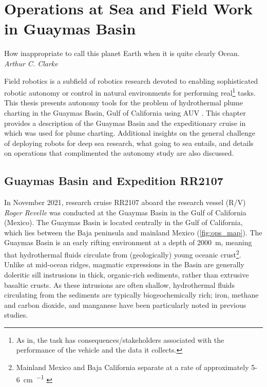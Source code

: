 \chapter{Operations at Sea and Field Work in Guaymas Basin}
\label{chap:opsatsea}

\begin{center}
    \begin{minipage}{0.6\textwidth}
      \begin{small}
        How inappropriate to call this planet Earth when it is quite clearly Ocean.\\ \emph{Arthur C. Clarke}
      \end{small}
    \end{minipage}
    \vspace{0.5cm}
\end{center}

Field robotics is a subfield of robotics research devoted to enabling sophisticated robotic autonomy or control in natural environments for performing real\footnote{As in, the task has consequences/stakeholders associated with the performance of the vehicle and the data it collects.} tasks.
This thesis presents autonomy tools for the problem of hydrothermal plume charting in the Guaymas Basin, Gulf of California using AUV \Sentry. 
This chapter provides a description of the Guaymas Basin and the expeditionary cruise in which \Sentry was used for plume charting.
Additional insights on the general challenge of deploying robots for deep sea research, what going to sea entails, and details on operations that complimented the autonomy study are also discussed. 

\section{Guaymas Basin and Expedition RR2107}
\label{sec:guaymas_description}
In November 2021, research cruise RR2107 aboard the research vessel (R/V) \emph{Roger Revelle} was conducted at the Guaymas Basin in the Gulf of California (Mexico).
The Guaymas Basin is located centrally in the Gulf of California, which lies between the Baja peninsula and mainland Mexico (\cref{fig:ops_map}).
The Guaymas Basin is an early rifting environment at a depth of \SI{2000}{\meter}\autocite{scholz2019shelf,moore1982geologic,teske2016guaymas}, meaning that hydrothermal fluids circulate from (geologically) young oceanic crust\footnote{Mainland Mexico and Baja California separate at a rate of approximately 5-\SI{6}{\cm\per\year} \autocite{lonsdale1985hydrothermal}}.
Unlike at mid-ocean ridges, magmatic expressions in the Basin are generally doleritic sill instrusions in thick, organic-rich sediments, rather than extrusive basaltic crusts\autocite{lonsdale1985hydrothermal,teske2019characteristics}.
As these intrusions are often shallow, hydrothermal fluids circulating from the sediments are typically biogeochemically rich; iron\autocite{scholz2019shelf}, methane and carbon dioxide\autocite{geilert2018formation}, and manganese\autocite{campbell1988manganese} have been particularly noted in previous studies.


